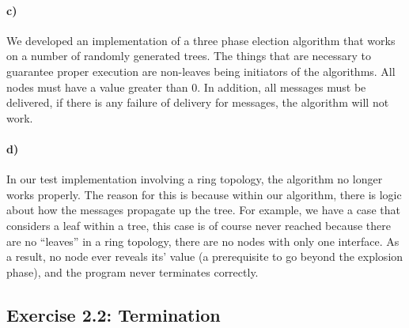 \documentclass[12pt,a4paper]{article}
\begin{document}
\paragraph{c)} %
We developed an implementation of a three phase election algorithm that works on a number of randomly generated trees. The things that are necessary to guarantee proper execution are non-leaves being initiators of the algorithms. All nodes must have a value greater than 0. In addition, all messages must be delivered, if there is any failure of delivery for messages, the algorithm will not work.
\paragraph{d)} %
In our test implementation involving a ring topology, the algorithm no longer works properly. The reason for this is because within our algorithm, there is logic about how the messages propagate up the tree. For example, we have a case that considers a leaf within a tree, this case is of course never reached because there are no ``leaves'' in a ring topology, there are no nodes with only one interface. As a result, no node ever reveals its' value (a prerequisite to go beyond the explosion phase), and the program never terminates correctly.
\subsection*{Exercise 2.2: Termination}
\end{document}
